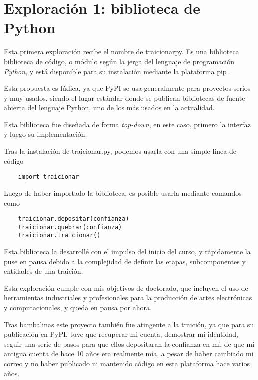 \documentclass{article}
\begin{document}
\clearpage

\section{Exploración 1: biblioteca de Python}

Esta primera exploración recibe el nombre de traicionarpy\cite{traicionarpyGitHub}. Es una biblioteca biblioteca de código, o módulo según la jerga del lenguaje de programación \textit{Python}, y está disponible para su instalación mediante la plataforma pip \cite{traicionarPyPI}.

Esta propuesta es lúdica, ya que PyPI se usa generalmente para proyectos serios y muy usados, siendo el lugar estándar donde se publican bibliotecas de fuente abierta del lenguaje Python, uno de los más usados en la actualidad.

Esta biblioteca fue diseñada de forma \textit{top-down}, en este caso, primero la interfaz y luego su implementación.

Tras la instalación de traicionar.py, podemos usarla con una simple línea de código

\begin{lstlisting}
    import traicionar
\end{lstlisting}

Luego de haber importado la biblioteca, es posible usarla mediante comandos como

\begin{lstlisting}
    traicionar.depositar(confianza)
    traicionar.quebrar(confianza)
    traicionar.traicionar()
\end{lstlisting}

Esta biblioteca la desarrollé con el impulso del inicio del curso, y rápidamente la puse en pausa debido a la complejidad de definir las etapas, subcomponentes y entidades de una traición.

Esta exploración cumple con mis objetivos de doctorado, que incluyen el uso de herramientas industriales y profesionales para la producción de artes electrónicas y computacionales, y queda en pausa por ahora.

Tras bambalinas este proyecto también fue atingente a la traición, ya que para su publicación en PyPI, tuve que recuperar mi cuenta, demostrar mi identidad, seguir una serie de pasos para que ellos depositaran la confianza en mí, de que mi antigua cuenta de hace 10 años era realmente mía, a pesar de haber cambiado mi correo y no haber publicado ni mantenido código en esta plataforma hace  varios años.
\end{document}
